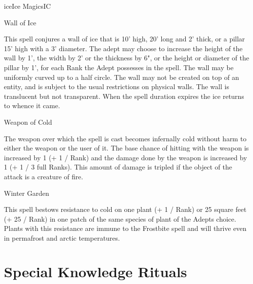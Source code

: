 \begin{College}[1.5]{ice}{Ice Magics}{IC}
\begin{spell}[S-15]{Wall of Ice}
\begin{effects}
This spell conjures a wall of ice that is 10’ high, 20’ long and 2’
thick, or a pillar 15’ high with a 3’ diameter.  The adept may choose
to increase the height of the wall by 1’, the width by 2’ or the
thickness by 6", or the height or diameter of the pillar by 1’, for
each Rank the Adept possesses in the spell. The wall may be uniformly
curved up to a half circle. The wall may not be created on top of an
entity, and is subject to the usual restrictions on physical walls.
The wall is translucent but not transparent. When the spell duration
expires the ice returns to whence it came.
\end{effects}
\end{spell}

\begin{spell}[S-16]{Weapon of Cold}
\begin{effects}
The weapon over which the spell is cast becomes infernally cold
without harm to either the weapon or the user of it. The base chance
of hitting with the weapon is increased by 1 (+ 1 / Rank) and the
damage done by the weapon is increased by 1 (+ 1 / 3 full Ranks).
This amount of damage is tripled if the object of the attack is a
creature of fire.
\end{effects}
\end{spell}

\begin{spell}[S-17]{Winter Garden}

\begin{effects}
This spell bestows resistance to cold on one plant (+ 1 / Rank) or 25
square feet (+ 25 / Rank) in one patch of the same species of plant of
the Adepts choice.  Plants with this resistance are immune to the
Frostbite spell and will thrive even in permafrost and arctic
temperatures.
\end{effects}
\end{spell}


\section{Special Knowledge Rituals}


\end{College}
